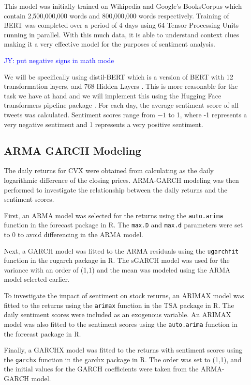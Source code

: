 \documentclass[12pt, letterpaper, titlepage]{article}
\newcommand{\jy}[1]{\textcolor{blue}{JY: #1}}
\begin{document}
This model was initially trained on Wikipedia and Google’s BooksCorpus which contain 2,500,000,000 words and 800,000,000 words respectively. Training of BERT was completed over a period of 4 days using 64 Tensor Processing Units running in parallel. With this much data, it is able to understand context clues making it a very effective model for the purposes of sentiment analysis.

\jy{put negative signs in math mode}

We will be specifically using distil-BERT which is a version of BERT with 12 transformation layers, and 768 Hidden Layers \citep{muller_2022}. This is more reasonable for the task we have at hand and we will implement this using the Hugging Face transformers pipeline package \citep{huggingface2023}. For each day, the average sentiment score of all tweets was calculated. Sentiment scores range from $-1$ to 1, where -1 represents a very negative sentiment and 1 represents a very positive sentiment.

\subsection{ARMA GARCH Modeling}
The daily returns for CVX were obtained from calculating as the daily logarithmic difference of the closing prices. ARMA-GARCH modeling was then performed to investigate the relationship between the daily returns and the sentiment scores.

First, an ARMA model was selected for the returns using the \texttt{auto.arima} function in the forecast package in R. The \texttt{max.D} and \texttt{max.d} parameters were set to 0 to avoid differencing in the ARMA model.

Next, a GARCH model was fitted to the ARMA residuals using the \texttt{ugarchfit} function in the rugarch package in R. The sGARCH model was used for the variance with an order of (1,1) and the mean was modeled using the ARMA model selected earlier.

To investigate the impact of sentiment on stock returns, an ARIMAX model was fitted to the returns using the \texttt{arimax} function in the TSA package in R. The daily sentiment scores were included as an exogenous variable. An ARIMAX model was also fitted to the sentiment scores using the \texttt{auto.arima} function in the forecast package in R.

Finally, a GARCHX model was fitted to the returns with sentiment scores using the \texttt{garchx} function in the garchx package in R. The order was set to (1,1), and the initial values for the GARCH coefficients were taken from the ARMA-GARCH model.
\end{document}
